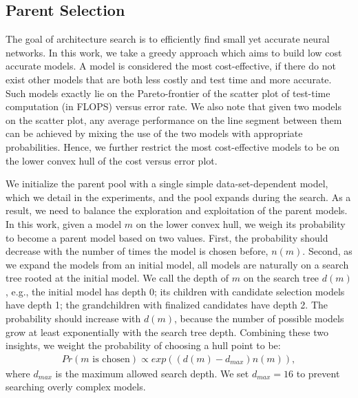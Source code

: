 \subsection{Parent Selection}
\label{sec:parent_choice}




The goal of architecture search is to efficiently find small yet accurate
neural networks. In this work, we take a greedy approach which aims to build low cost accurate models. A model is considered the most
cost-effective, if there do not exist other models that are both less
costly and test time and more accurate. Such models exactly lie on the
Pareto-frontier of the scatter plot of test-time computation (in
FLOPS) versus error rate. We also note that given two models on the
scatter plot, any average performance on the line segment between them
can be achieved by mixing the use of the two models with appropriate
probabilities. Hence, we further restrict the most cost-effective
models to be on the lower convex hull of the cost versus error plot.

We initialize the parent pool with a single simple data-set-dependent 
model, which we detail in the experiments, and the pool expands during 
the search.
As a result, we need to balance the exploration and exploitation of the 
parent models. 
In this work, given a model $m$ on the lower convex hull, we weigh its 
probability to become a parent model based on two values.
First, the probability should decrease with the number of times the model 
is chosen before, $n(m)$. Second, as we expand the models from an initial
model, all models are naturally on a search tree rooted at the initial model.
We call the depth of $m$ on the search tree $d(m)$, e.g., 
the initial model has depth 0; its children with candidate selection
models have depth 1; the grandchildren with finalized candidates have depth 2. 
The probability
should increase with $d(m)$, because the number of possible models grow at 
least exponentially with the search tree depth. Combining these two insights, 
we weight the probability of choosing a hull point to be:
\begin{align}
    Pr(\text{$m$ is chosen}) \propto exp( (d(m) - d_{max}) n(m) ),
    \label{eq:parent_weight}
\end{align}
where $d_{max}$ is the maximum allowed search depth. We set 
$d_{max} = 16$ to prevent searching overly complex models. 

